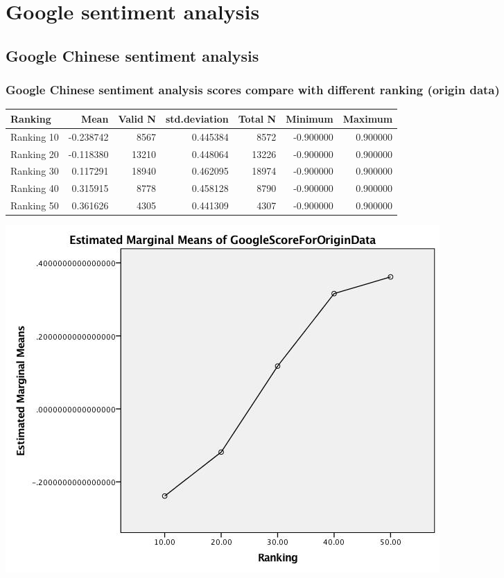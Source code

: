 \section{Google sentiment analysis}
\label{sec:org94c30eb}
\subsection{Google Chinese sentiment analysis}
\label{sec:org11ae8ea}
\subsubsection{Google Chinese sentiment analysis scores compare with different ranking (origin data)}
\label{sec:org70ba0e4}
\begin{center}
\begin{tabular}{lrrrrrr}
Ranking & Mean & Valid N & std.deviation & Total N & Minimum & Maximum\\
\hline
Ranking 10 & -0.238742 & 8567 & 0.445384 & 8572 & -0.900000 & 0.900000\\
Ranking 20 & -0.118380 & 13210 & 0.448064 & 13226 & -0.900000 & 0.900000\\
Ranking 30 & 0.117291 & 18940 & 0.462095 & 18974 & -0.900000 & 0.900000\\
Ranking 40 & 0.315915 & 8778 & 0.458128 & 8790 & -0.900000 & 0.900000\\
Ranking 50 & 0.361626 & 4305 & 0.441309 & 4307 & -0.900000 & 0.900000\\
\end{tabular}
\end{center}

\begin{center}
\includegraphics[width=.9\linewidth]{./img/MarginalMeansOfGoogleScoreForOriginData.jpg}
\end{center}

